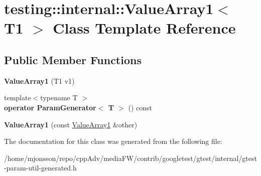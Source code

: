 \hypertarget{classtesting_1_1internal_1_1ValueArray1}{}\section{testing\+:\+:internal\+:\+:Value\+Array1$<$ T1 $>$ Class Template Reference}
\label{classtesting_1_1internal_1_1ValueArray1}
\subsection*{Public Member Functions}
\begin{DoxyCompactItemize}
\item 
\mbox{\label{classtesting_1_1internal_1_1ValueArray1_a8eaffed25a4ddbe790472ca07595a319}} 
{\bfseries Value\+Array1} (T1 v1)
\item 
\mbox{\label{classtesting_1_1internal_1_1ValueArray1_a1ffe0a28fd09efa980df1aaa3f7af2a0}} 
{\footnotesize template$<$typename T $>$ }\\{\bfseries operator Param\+Generator$<$ T $>$} () const
\item 
\mbox{\label{classtesting_1_1internal_1_1ValueArray1_a54a3968da3354334cb4d730f5254e216}} 
{\bfseries Value\+Array1} (const \hyperlink{classtesting_1_1internal_1_1ValueArray1}{Value\+Array1} \&other)
\end{DoxyCompactItemize}


The documentation for this class was generated from the following file\+:\begin{DoxyCompactItemize}
\item 
/home/mjonsson/repo/cpp\+Adv/media\+F\+W/contrib/googletest/gtest/internal/gtest-\/param-\/util-\/generated.\+h\end{DoxyCompactItemize}
